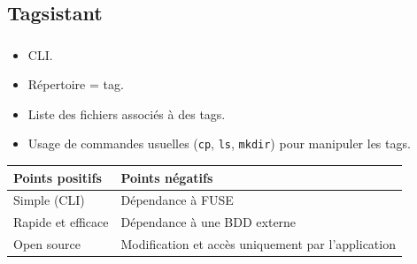 \documentclass[10pt]{beamer}
\begin{document}
\subsection{Tagsistant}
\begin{frame}
    \frametitle{\subsecname}
    \begin{itemize}
        \item CLI.
        \item Répertoire = tag.
        \item Liste des fichiers associés à des tags.
        \item Usage de commandes usuelles (\texttt{cp}, \texttt{ls}, 
            \texttt{mkdir}) pour manipuler les tags.
    \end{itemize}
    \pause
    \begin{center}
        \begin{tabularx}{8cm}{|X|X|} \hline
            \textbf{Points positifs} & \textbf{Points négatifs} \\ \hline
            Simple (CLI) & Dépendance à FUSE \\ \hline
            Rapide et efficace & Dépendance à une BDD externe \\ \hline
            Open source & Modification et accès uniquement par l'application \\ \hline
        \end{tabularx}
    \end{center}
\end{frame}
\end{document}
